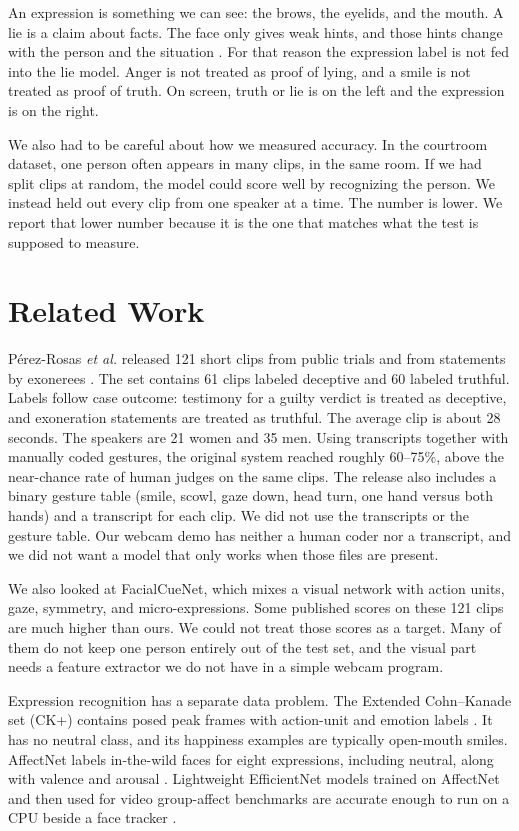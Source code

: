 \documentclass[conference]{IEEEtran}
\begin{document}
An expression is something we can see: the brows, the eyelids, and the mouth. A lie is a claim about facts. The face only gives weak hints, and those hints change with the person and the situation \cite{perez2015trial}. For that reason the expression label is not fed into the lie model. Anger is not treated as proof of lying, and a smile is not treated as proof of truth. On screen, truth or lie is on the left and the expression is on the right.

We also had to be careful about how we measured accuracy. In the courtroom dataset, one person often appears in many clips, in the same room. If we had split clips at random, the model could score well by recognizing the person. We instead held out every clip from one speaker at a time. The number is lower. We report that lower number because it is the one that matches what the test is supposed to measure.

\section{Related Work}
P\'erez-Rosas \textit{et al.} released 121 short clips from public trials and from statements by exonerees \cite{perez2015trial}. The set contains 61 clips labeled deceptive and 60 labeled truthful. Labels follow case outcome: testimony for a guilty verdict is treated as deceptive, and exoneration statements are treated as truthful. The average clip is about 28 seconds. The speakers are 21 women and 35 men. Using transcripts together with manually coded gestures, the original system reached roughly 60--75\%, above the near-chance rate of human judges on the same clips. The release also includes a binary gesture table (smile, scowl, gaze down, head turn, one hand versus both hands) and a transcript for each clip. We did not use the transcripts or the gesture table. Our webcam demo has neither a human coder nor a transcript, and we did not want a model that only works when those files are present.

We also looked at FacialCueNet, which mixes a visual network with action units, gaze, symmetry, and micro-expressions. Some published scores on these 121 clips are much higher than ours. We could not treat those scores as a target. Many of them do not keep one person entirely out of the test set, and the visual part needs a feature extractor we do not have in a simple webcam program.

Expression recognition has a separate data problem. The Extended Cohn--Kanade set (CK+) contains posed peak frames with action-unit and emotion labels \cite{lucey2010ck}. It has no neutral class, and its happiness examples are typically open-mouth smiles. AffectNet labels in-the-wild faces for eight expressions, including neutral, along with valence and arousal \cite{mollahosseini2019affectnet}. Lightweight EfficientNet models trained on AffectNet and then used for video group-affect benchmarks are accurate enough to run on a CPU beside a face tracker \cite{savchenko2021hsemotion}.
\end{document}
